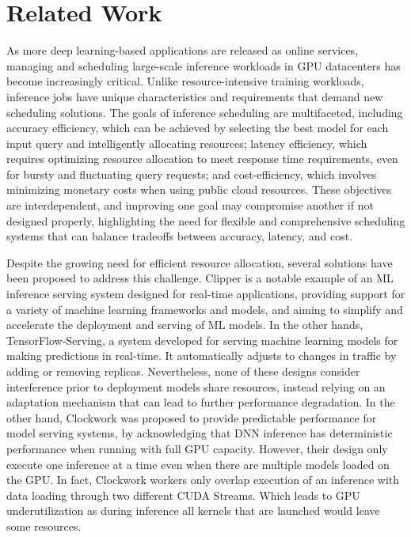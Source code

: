 \section{Related Work}\label{sec:related}

As more deep learning-based applications are released as online services, managing and scheduling large-scale inference workloads in GPU datacenters has become increasingly critical. Unlike resource-intensive training workloads, inference jobs have unique characteristics and requirements that demand new scheduling solutions. The goals of inference scheduling are multifaceted, including accuracy efficiency, which can be achieved by selecting the best model for each input query and intelligently allocating resources; latency efficiency, which requires optimizing resource allocation to meet response time requirements, even for bursty and fluctuating query requests; and cost-efficiency, which involves minimizing monetary costs when using public cloud resources. These objectives are interdependent, and improving one goal may compromise another if not designed properly, highlighting the need for flexible and comprehensive scheduling systems that can balance tradeoffs between accuracy, latency, and cost.

Despite the growing need for efficient resource allocation, several solutions have been proposed to address this challenge. Clipper is a notable example of an ML inference serving system designed for real-time applications, providing support for a variety of machine learning frameworks and models, and aiming to simplify and accelerate the deployment and serving of ML models. In the other hands, TensorFlow-Serving, a system developed for serving machine learning models for making predictions in real-time. It automatically adjusts to changes in traffic by adding or removing replicas. Nevertheless, none of these designs consider interference prior to deployment models share resources, instead relying on an adaptation mechanism that can lead to further performance degradation. In the other hand, Clockwork was proposed to provide predictable performance for model serving systems, by acknowledging that DNN inference has deterministic performance when running with full GPU capacity. However, their design only execute one inference at a time even when there are multiple models loaded on the GPU. In fact, Clockwork workers only overlap execution of an inference with data loading through two different CUDA Streams. Which leads to GPU underutilization as during inference all kernels that are launched would leave some resources.

